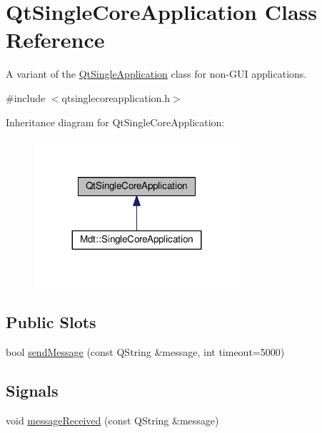 \hypertarget{class_qt_single_core_application}{}\section{Qt\+Single\+Core\+Application Class Reference}
\label{class_qt_single_core_application}


A variant of the \hyperlink{class_qt_single_application}{Qt\+Single\+Application} class for non-\/\+G\+UI applications.  




{\ttfamily \#include $<$qtsinglecoreapplication.\+h$>$}



Inheritance diagram for Qt\+Single\+Core\+Application\+:
\nopagebreak
\begin{figure}[H]
\begin{center}
\leavevmode
\includegraphics[width=215pt]{class_qt_single_core_application__inherit__graph}
\end{center}
\end{figure}
\subsection*{Public Slots}
\begin{DoxyCompactItemize}
\item 
bool \hyperlink{class_qt_single_core_application_a07493d0807b216ca870adc6d40f856b0}{send\+Message} (const Q\+String \&message, int timeout=5000)
\end{DoxyCompactItemize}
\subsection*{Signals}
\begin{DoxyCompactItemize}
\item 
void \hyperlink{class_qt_single_core_application_a1af66a1770ff5eec8006a26a2ce42ca1}{message\+Received} (const Q\+String \&message)
\end{DoxyCompactItemize}
